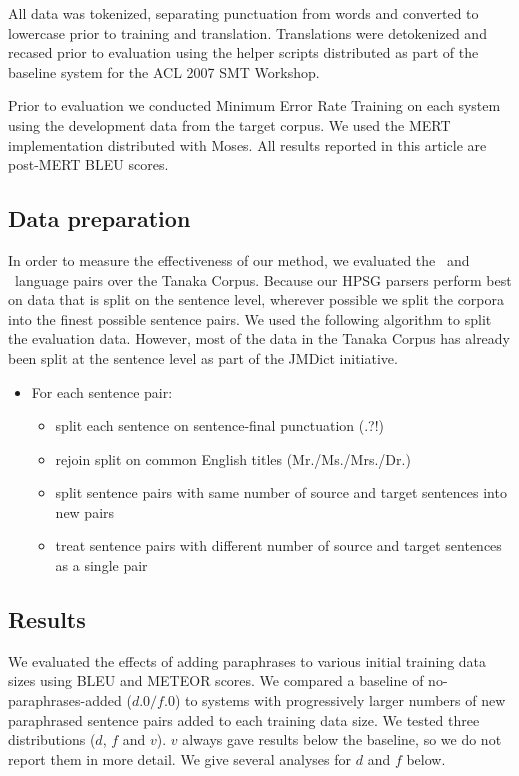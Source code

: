 \documentclass[english]{jnlp_1.4}
\newcommand{\JE}{}
\newcommand{\EJ}{}
\begin{document}
All data was tokenized, separating punctuation from words and
converted to lowercase prior to training and translation. Translations
were detokenized and recased prior to evaluation using the helper
scripts distributed as part of the baseline system for the ACL 2007
SMT Workshop.

Prior to evaluation we conducted Minimum Error Rate Training on each
system using the development data from the target corpus. We used the
MERT implementation distributed with Moses. All results reported in
this article are post-MERT BLEU scores.



\subsection{Data preparation}

In order to measure the effectiveness of our method, we evaluated the
\JE~and \EJ~language pairs over the Tanaka Corpus. Because our HPSG
parsers perform best on data that is split on the sentence level,
wherever possible we split the corpora into the finest possible
sentence pairs. We used the following algorithm to split the
evaluation data. However, most of the data in the Tanaka Corpus has
already been split at the sentence level as part of the JMDict
initiative.

\begin{itemize}
	\item For each sentence pair:
	\begin{itemize}
		\item split each sentence on sentence-final punctuation (.?!)
		\item rejoin split on common English titles (Mr./Ms./Mrs./Dr.)
		\item split sentence pairs with same number of source and target sentences
		      into new pairs
		\item treat sentence pairs with different number of source and target sentences
		      as a single pair
	\end{itemize}
\end{itemize}


\subsection{Results}

We evaluated the effects of adding paraphrases to various initial
training data sizes using BLEU and METEOR scores. We compared a
baseline of no-paraphrases-added ($d.0/f.0$) to systems with
progressively larger numbers of new paraphrased sentence pairs added
to each training data size. We tested three distributions ($d$, $f$
and $v$). $v$ always gave results below the baseline, so we do not
report them in more detail. We give several analyses for $d$ and $f$
below.
\end{document}
